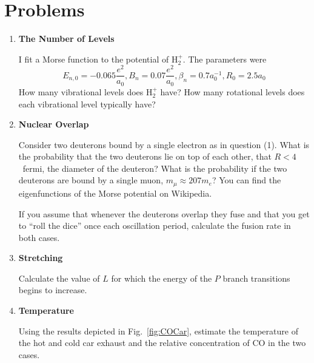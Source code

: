 \section{Problems}
\begin{enumerate}

\item{\bf The Number of Levels}

I fit a Morse function to the potential of  H$_2^+$.  The parameters
were
\begin{equation}
E_{n,0} = -0.065 \frac{e^2}{a_0}, B_n = 0.07 \frac{e^2}{a_0}, \beta_n
= 0.7 a_0^{-1}, R_0 = 2.5 a_0
\label{eq:590}
\end{equation}
How many vibrational levels does H$_2^+$ have?   How many rotational
levels does each vibrational level typically have?

\item{\bf Nuclear Overlap}

Consider two deuterons bound by a single electron as in question (1).
What is the probability that the two deuterons lie on top of each
other, {\ie} that $R<4$~fermi, the diameter of the deuteron?   What is the
probability if the two deuterons are bound by a single muon, $m_\mu
\approx 207 m_e$?  You can find the eigenfunctions of the Morse
potential on Wikipedia.

If you assume that whenever the deuterons overlap they fuse and that
you get to ``roll the dice'' once each oscillation period, calculate
the fusion rate in both cases.

\item{\bf Stretching}

Calculate the value of $L$ for which the energy of the $P$ branch
transitions begins to increase.

\item{\bf Temperature}

Using the results depicted in Fig.~\ref{fig:COCar}, estimate the
temperature of the hot and cold car exhaust and the relative
concentration of CO in the two cases.
\end{enumerate}

